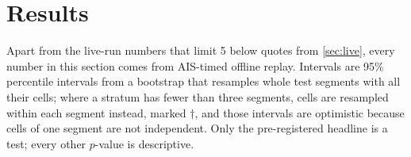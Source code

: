 %

\section{Results}
\label{sec:results}

Apart from the live-run numbers that limit 5 below quotes from \cref{sec:live}, every number in this
section comes from AIS-timed offline replay. Intervals are 95\%
percentile intervals from a bootstrap that resamples whole test segments with all their cells; where
a stratum has fewer than three segments, cells are resampled within each segment instead, marked
$\dagger$, and those intervals are optimistic because cells of one segment are not independent. Only
the pre-registered headline is a test; every other $p$-value is descriptive.

